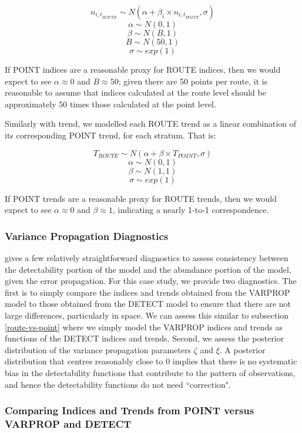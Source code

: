 \documentclass[12pt]{article}
\begin{document}
$$	n_{{i,t}_{ROUTE}} \sim N(\alpha + \beta_i \times n_{{i,t}_{POINT}}, \sigma) $$
$$	\alpha \sim N(0,1) $$
$$	\beta \sim N(B, 1) $$
$$	B \sim N(50, 1) $$
$$	\sigma \sim exp(1)$$

If POINT indices are a reasonable proxy for ROUTE indices, then we would expect to see $\alpha \approx 0$ and $B \approx 50$; given there are 50 points per route, it is reasonable to assume that indices calculated at the route level should be approximately 50 times those calculated at the point level.

\par Similarly with trend, we modelled each ROUTE trend as a linear combination of its corresponding POINT trend, for each stratum.
That is:

$$ T_{ROUTE} \sim N(\alpha + \beta \times T_{POINT}, \sigma)$$
$$ \alpha \sim N(0,1) $$
$$ \beta \sim N(1,1) $$
$$ \sigma \sim exp(1) $$

If POINT trends are a reasonable proxy for ROUTE trends, then we would expect to see $\alpha \approx 0$ and $\beta \approx 1$, indicating a nearly 1-to-1 correspondence. 

\subsubsection{Variance Propagation Diagnostics}

\par \citet{bravington_variance_2021} gives a few relatively straightforward diagnostics to assess consistency between the detectability portion of the model and the abundance portion of the model, given the error propagation.
For this case study, we provide two diagnostics.
The first is to simply compare the indices and trends obtained from the VARPROP model to those obtained from the DETECT model to ensure that there are not large differences, particularly in space. 
We can assess this similar to subsection \ref{route-vs-point} where we simply model the VARPROP indices and trends as functions of the DETECT indices and trends.
Second, we assess the posterior distribution of the variance propagation parameters $\zeta$ and $\xi$.
A posterior distribution that centres reasonably close to 0 implies that there is no systematic bias in the detectability functions that contribute to the pattern of observations, and hence the detectability functions do not need ``correction".

\subsubsection{Comparing Indices and Trends from POINT versus VARPROP and DETECT}
\end{document}
